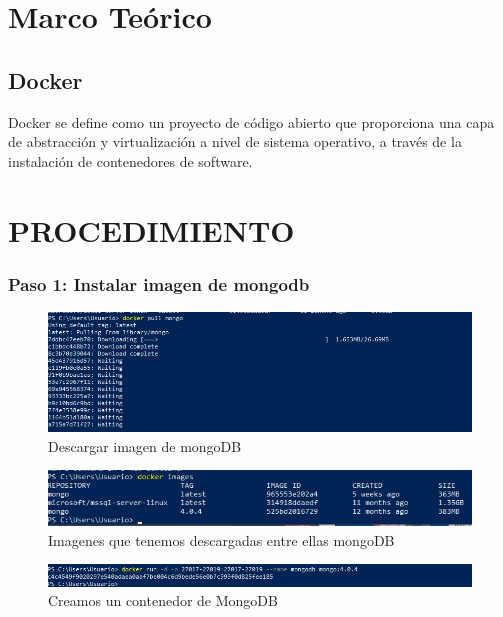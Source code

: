 \documentclass[preprint,12pt]{elsarticle}
\begin{document}
\section{Marco Teórico}


\subsection {\textbf{Docker}}
Docker se define como un proyecto de código abierto que proporciona una capa de abstracción y virtualización a nivel de sistema operativo, a través de la instalación de contenedores de software.

\section{PROCEDIMIENTO}

\subsubsection{\textbf{Paso 1: Instalar imagen de mongodb}}
\begin{figure}[H]
	\begin{center}
		\includegraphics[width=12cm]{./IMAGENES/foto1} 
		\caption{Descargar imagen de mongoDB}
	\end{center}
\end{figure}

\begin{figure}[H]
	\begin{center}
		\includegraphics[width=12cm]{./IMAGENES/foto2} 
		\caption{Imagenes que tenemos descargadas entre ellas mongoDB}
	\end{center}
\end{figure}

\begin{figure}[H]
	\begin{center}
		\includegraphics[width=12cm]{./IMAGENES/foto3} 
		\caption{Creamos un contenedor de MongoDB}
	\end{center}
\end{figure}
\end{document}
